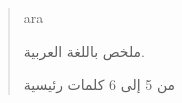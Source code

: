 \begin{abstract}
    \markboth{\abstractname}{}
\begin{scontents}[store-env=lang]
ara
\end{scontents}
\begin{scontents}[store-env=abstracts,print-env=true]
ملخص باللغة العربية.
\end{scontents}

\begin{scontents}[store-env=keywords,print-env=true]
من 5 إلى 6 كلمات رئيسية
\end{scontents}
\end{abstract}
\cleardoublepage
{}
